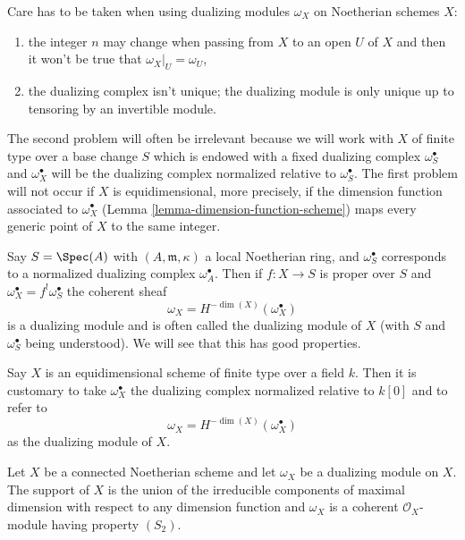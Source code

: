 \medskip\noindent
Care has to be taken when using dualizing modules $\omega_X$ on Noetherian
schemes $X$:
\begin{enumerate}
\item the integer $n$ may change when passing from $X$ to an open $U$
of $X$ and then it won't be true that $\omega_X|_U = \omega_U$,
\item the dualizing complex isn't unique; the dualizing module
is only unique up to tensoring by an invertible module.
\end{enumerate}
The second problem will often be irrelevant because we will work
with $X$ of finite type over a base change $S$ which is
endowed with a fixed dualizing complex $\omega_S^\bullet$ and
$\omega_X^\bullet$ will be the dualizing complex normalized relative
to $\omega_S^\bullet$.
The first problem will not occur if $X$ is equidimensional, more precisely,
if the dimension function associated to $\omega_X^\bullet$
(Lemma \ref{lemma-dimension-function-scheme})
maps every generic point of $X$ to the same integer.

\begin{example}
\label{example-proper-over-local}
Say $S = \Spec(A)$ with $(A, \mathfrak m, \kappa)$
a local Noetherian ring, and $\omega_S^\bullet$ corresponds to
a normalized dualizing complex $\omega_A^\bullet$. Then if
$f : X \to S$ is proper over $S$ and $\omega_X^\bullet = f^!\omega_S^\bullet$
the coherent sheaf
$$
\omega_X = H^{-\dim(X)}(\omega_X^\bullet)
$$
is a dualizing module and is often called the dualizing module
of $X$ (with $S$ and $\omega_S^\bullet$ being understood). We will
see that this has good properties.
\end{example}

\begin{example}
\label{example-equidimensional-over-field}
Say $X$ is an equidimensional scheme of finite type
over a field $k$. Then it is customary to take
$\omega_X^\bullet$ the dualizing complex normalized relative to $k[0]$
and to refer to
$$
\omega_X = H^{-\dim(X)}(\omega_X^\bullet)
$$
as the dualizing module of $X$.
\end{example}

\begin{lemma}
\label{lemma-dualizing-module}
Let $X$ be a connected Noetherian scheme and let $\omega_X$ be a dualizing
module on $X$. The support of $X$ is the union of the irreducible
components of maximal dimension with respect to any dimension function
and $\omega_X$ is a coherent $\mathcal{O}_X$-module having property $(S_2)$.
\end{lemma}

